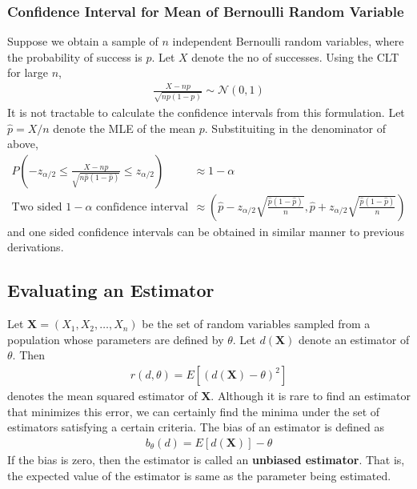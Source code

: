 \documentclass[../probability-notes.tex]{subfiles}
\begin{document}
    \subsubsection{Confidence Interval for Mean of Bernoulli Random Variable}
    Suppose we obtain a sample of $n$ independent Bernoulli random variables, where the probability of success is $p$. Let $X$ denote the no of successes. Using the CLT for large $n$,
    \begin{align*}
        \frac{X - np}{\sqrt{np(1-p)}} \sim \mathcal{N}(0, 1)
    \end{align*}
    It is not tractable to calculate the confidence intervals from this formulation. Let $\hat{p} = X/n$ denote the MLE of the mean $p$. Substituiting in the denominator of above,
    \begin{align*}
        P(-z_{\alpha/2} \leq \frac{X - np}{\sqrt{n\hat{p}(1-\hat{p})}} \leq z_{\alpha/2}) &\approx 1-\alpha\\
        \text{Two sided $1-\alpha$ confidence interval} &\approx (\hat{p} - z_{\alpha/2}\sqrt{\frac{\hat{p}(1-\hat{p})}{n}}, \hat{p} + z_{\alpha/2}\sqrt{\frac{\hat{p}(1-\hat{p})}{n}})
    \end{align*}
    and one sided confidence intervals can be obtained in similar manner to previous derivations.

    

    \subsection{Evaluating an Estimator}
    Let $\boldsymbol{X} = (X_{1}, X_{2}, \ldots, X_{n})$ be the set of random variables sampled from a population whose parameters are defined by $\theta$. Let $d(\boldsymbol{X})$ denote an estimator of $\theta$. Then
    \begin{align*}
        r(d, \theta) = E[(d(\boldsymbol{X}) - \theta)^{2}]
    \end{align*}
    denotes the mean squared estimator of $\boldsymbol{X}$. Although it is rare to find an estimator that minimizes this error, we can certainly find the minima under the set of estimators satisfying a certain criteria.\newline
    The bias of an estimator is defined as
    \begin{align*}
        b_{\theta}(d) = E[d(\boldsymbol{X})] - \theta
    \end{align*}
    If the bias is zero, then the estimator is called an \textbf{unbiased estimator}. That is, the expected value of the estimator is same as the parameter being estimated.\newline
\end{document}
